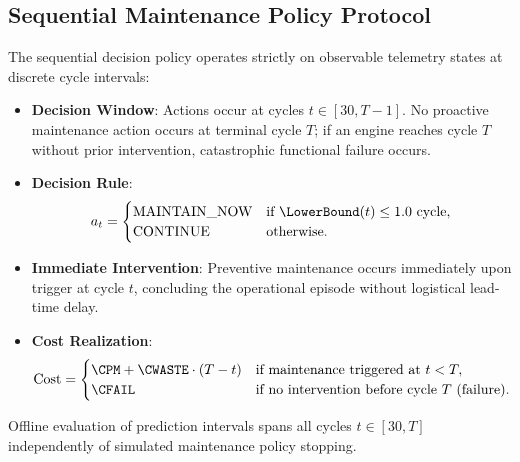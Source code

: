 \subsection*{Sequential Maintenance Policy Protocol}
The sequential decision policy operates strictly on observable telemetry states at discrete cycle intervals:
\begin{itemize}
    \item \textbf{Decision Window}: Actions occur at cycles $t \in [30, T - 1]$. No proactive maintenance action occurs at terminal cycle $T$; if an engine reaches cycle $T$ without prior intervention, catastrophic functional failure occurs.
    \item \textbf{Decision Rule}:
    \begin{equation}
    a_t = \begin{cases} \text{MAINTAIN\_NOW} & \text{if } \LowerBound(t) \le 1.0 \text{ cycle}, \\ \text{CONTINUE} & \text{otherwise.} \end{cases}
    \end{equation}
    \item \textbf{Immediate Intervention}: Preventive maintenance occurs immediately upon trigger at cycle $t$, concluding the operational episode without logistical lead-time delay.
    \item \textbf{Cost Realization}:
    \begin{equation}
    \text{Cost} = \begin{cases} \CPM + \CWASTE \cdot (T - t) & \text{if maintenance triggered at } t < T, \\ \CFAIL & \text{if no intervention before cycle } T \text{ (failure).} \end{cases}
    \end{equation}
\end{itemize}
Offline evaluation of prediction intervals spans all cycles $t \in [30, T]$ independently of simulated maintenance policy stopping.
